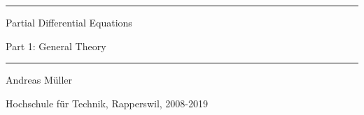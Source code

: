 \documentclass[a4paper,12pt]{book}
\begin{document}
\pagestyle{fancy}
\lhead{}
\rhead{}
\frontmatter
\newcommand\HRule{\noindent\rule{\linewidth}{1.5pt}}
\begin{titlepage}
\HRule
\vspace*{10pt}
\begin{flushright}
{\Huge
Partial Differential Equations}
\end{flushright}
\begin{flushright}
{\Large Part 1: General Theory}
\end{flushright}
\HRule
\begin{flushright}
\vspace{30pt}
\LARGE
Andreas Müller
\end{flushright}
\begin{center}
Hochschule für Technik, Rapperswil, 2008-2019
\end{center}
\end{titlepage}
\hypersetup{
    colorlinks=true,
    linktoc=all,
    linkcolor=blue
}
\tableofcontents
\newtheorem{satz}{Theorem}[chapter]
\newtheorem{problem}[satz]{Problem}
\newtheorem{hilfssatz}[satz]{Lemma}
\newtheorem{definition}[satz]{Definition}
\newtheorem{annahme}[satz]{Assumption}
\newtheorem{aufgabe}[satz]{Task}
\newenvironment{beispiel}[1][Example]{%
\begin{proof}[#1]%
\renewcommand{\qedsymbol}{$\bigcirc$}
}{\end{proof}}
\allowdisplaybreaks
\mainmatter











\appendix

\vfill
\pagebreak
\ifodd\value{page}\else\null\clearpage\fi
{}
\rhead{}

\end{document}
